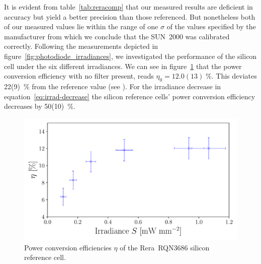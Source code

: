 \documentclass[a4paper,10pt,twocolumn]{article}
\begin{document}
\begin{extract*}
It is evident from table~\ref{tab:reracomp} that our measured results are deficient in accuracy but yield a better precision than those referenced. But nonetheless both of our measured values lie within the range of one $\sigma$ of the values specified by the manufacturer from which we conclude that the SUN~2000 was calibrated correctly.\mypar
Following the measurements depicted in figure~\ref{fig:photodiode_irradiances}, we investigated the performance of the silicon cell under the six different irradiances. We can see in figure~\ref{fig:reraPCE} that the power conversion efficiency with no filter present, reads $\eta_0 = 12.0(13)\;\%$. This deviates 22(9)~\% from the reference value (see \cite{reracat}). For the irradiance decrease in equation~\ref{eq:irrad-decrease} the silicon reference cells’ power conversion efficiency decreases by 50(10)~\%.
\begin{figure}[H]\centering
	\includegraphics[scale=.5]{../2_Pictures/ReRaGraph.pdf}
	\caption{Power conversion efficiencies $\eta$ of the Rera~RQN3686 silicon reference cell.}
	\label{fig:reraPCE}
\end{figure}


\end{extract*}
\end{document}
